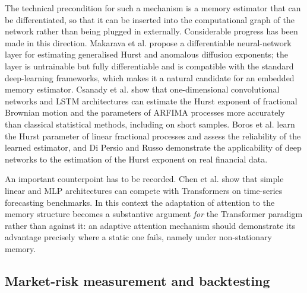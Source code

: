 \documentclass[journal]{IEEEtran}
\begin{document}
The technical precondition for such a mechanism is a memory estimator that can be differentiated,
so that it can be inserted into the computational graph of the network rather than being plugged in
externally. Considerable progress has been made in this direction. Makarava et al.
\cite{makarava2025differentiable} propose a differentiable neural-network layer for estimating
generalised Hurst and anomalous diffusion exponents; the layer is untrainable but fully
differentiable and is compatible with the standard deep-learning frameworks, which makes it a
natural candidate for an embedded memory estimator. Csanady et al. \cite{csanady2024parameter}
show that one-dimensional convolutional networks and LSTM architectures can estimate the Hurst
exponent of fractional Brownian motion and the parameters of ARFIMA processes more accurately than
classical statistical methods, including on short samples. Boros et al. \cite{boros2024deep} learn
the Hurst parameter of linear fractional processes and assess the reliability of the learned
estimator, and Di Persio and Russo \cite{dipersio2024deep} demonstrate the applicability of deep
networks to the estimation of the Hurst exponent on real financial data.

An important counterpoint has to be recorded. Chen et al. \cite{chen2024cats} show that simple
linear and MLP architectures can compete with Transformers on time-series forecasting benchmarks.
In this context the adaptation of attention to the memory structure becomes a substantive argument
\emph{for} the Transformer paradigm rather than against it: an adaptive attention mechanism should
demonstrate its advantage precisely where a static one fails, namely under non-stationary memory.

\subsection{Market-risk measurement and backtesting}
\end{document}

